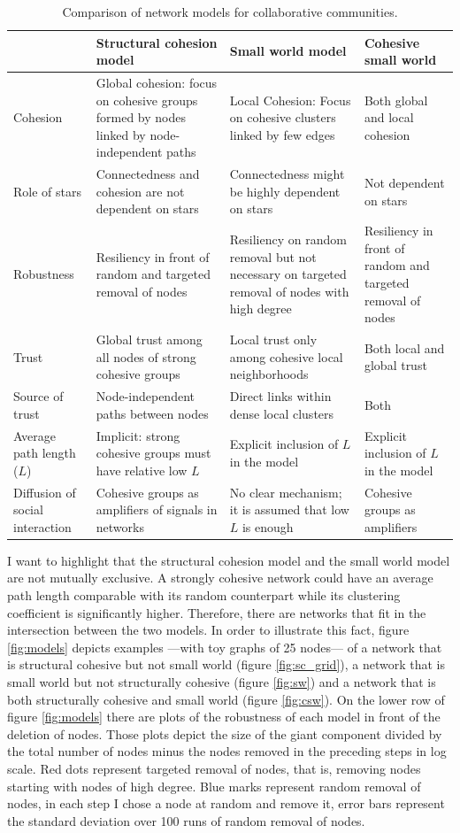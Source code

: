 \begin{table}[h]
\begin{tabular}{|p{2.5cm}|p{4.5cm}|p{4.5cm}|p{4cm}|}
\hline
&Structural cohesion model&Small world model& Cohesive small world\\
\hline
Cohesion&Global cohesion: focus on cohesive groups formed by nodes linked by node-independent paths&Local Cohesion: Focus on cohesive clusters linked by few edges&Both global and local cohesion\\
\hline
Role of stars&Connectedness and cohesion are not dependent on stars&Connectedness might be highly dependent on stars&Not dependent on stars\\
\hline
Robustness&Resiliency in front of random and targeted removal of nodes&Resiliency on random removal but not necessary on targeted removal of nodes with high degree&Resiliency in front of random and targeted removal of nodes\\
\hline
Trust&Global trust among all nodes of strong cohesive groups&Local trust only among cohesive local neighborhoods& Both local and global trust\\
\hline
Source of trust&Node-independent paths between nodes&Direct links within dense local clusters& Both\\
\hline
Average path length ($L$)&Implicit: strong cohesive groups must have relative low $L$&Explicit inclusion of $L$ in the model&Explicit inclusion of $L$ in the model\\
\hline
Diffusion of social interaction&Cohesive groups as amplifiers of signals in networks&No clear mechanism; it is assumed that low $L$ is enough&Cohesive groups as amplifiers\\
\hline
\end{tabular}
\caption{Comparison of network models for collaborative communities.}
\label{t:models}
\end{table}

I want to highlight that the structural cohesion model and the small world model are not mutually exclusive. A strongly cohesive network could have an average path length comparable with its random counterpart while its clustering coefficient is significantly higher. Therefore, there are networks that fit in the intersection between the two models. In order to illustrate this fact, figure \ref{fig:models} depicts examples ---with toy graphs of 25 nodes--- of a network that is structural cohesive but not small world (figure \ref{fig:sc_grid}), a network that is small world but not structurally cohesive (figure \ref{fig:sw}) and a network that is both structurally cohesive and small world (figure \ref{fig:csw}). On the lower row of figure \ref{fig:models} there are plots of the robustness of each model in front of the deletion of nodes. Those plots depict the size of the giant component divided by the total number of nodes minus the nodes removed in the preceding steps in log scale. Red dots represent targeted removal of nodes, that is, removing nodes starting with nodes of high degree. Blue marks represent random removal of nodes, in each step I chose a node at random and remove it, error bars represent the standard deviation over 100 runs of random removal of nodes.

